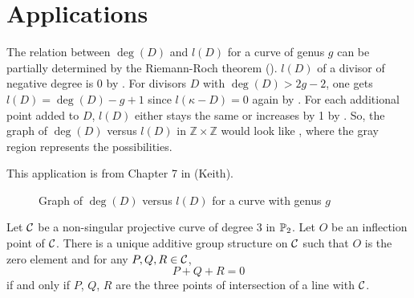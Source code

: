 \section{Applications}

The relation between $\deg(D)$ and $l(D)$ for a curve of genus $g$ can be partially determined by the Riemann-Roch theorem (). $l(D)$ of a divisor of negative degree is 0 by . For divisors $D$ with $\deg(D)>2g-2$, one gets $l(D)=\deg(D)-g+1$ since $l(\kappa-D)=0$ again by . For each additional point added to $D$, $l(D)$ either stays the same or increases by 1 by . So, the graph of $\deg(D)$ versus $l(D)$ in $\mathbb{Z}\times\mathbb{Z}$ would look like , where the gray region represents the possibilities.

This application is from Chapter 7 in \cite{ref:keith} (Keith).

\begin{figure}
    \centering
    \caption{Graph of $\deg(D)$ versus $l(D)$ for a curve with genus $g$}
    \label{fig:degdld}
\end{figure}

\begin{theorem}\label{thm:group}
    Let $\mathcal C$ be a non-singular projective curve of degree $3$ in $\mathbb P_2$. Let $O$ be an inflection point of $\mathcal C$. There is a unique additive group structure on $\mathcal C$ such that $O$ is the zero element and for any $P,Q,R\in\mathcal C$,
    $$P+Q+R=0$$
    if and only if $P$, $Q$, $R$ are the three points of intersection of a line with $\mathcal C$.
\end{theorem}

